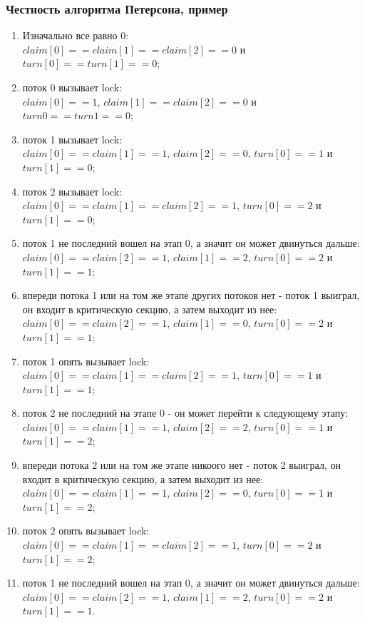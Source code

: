 \begin{frame}
\frametitle{Честность алгоритма Петерсона, пример}
\tiny\begin{enumerate}
  \item Изначально все равно 0:
  \\$claim[0] == claim[1] == claim[2] == 0$ и $turn[0] == turn[1] == 0$;
  \item поток 0 вызывает lock:
  \\$claim[0] == 1$, $claim[1] == claim[2] == 0$ и $turn0 == turn1 == 0$;
  \item поток 1 вызывает lock:
  \\$claim[0] == claim[1] == 1$, $claim[2] == 0$, $turn[0] == 1$ и
  $turn[1] == 0$;
  \item поток 2 вызывает lock:
  \\$claim[0] == claim[1] == claim[2] == 1$, $turn[0] == 2$ и $turn[1] == 0$;
  \item \alert{поток 1 не последний вошел на этап 0, а значит он может
  двинуться дальше:
  \\$claim[0] == claim[2] == 1$, $claim[1] == 2$, $turn[0] == 2$ и
  $turn[1] == 1$;}
  \item впереди потока 1 или на том же этапе других потоков нет - поток 1
  выиграл, он входит в критическую секцию, а затем выходит из нее:
  \\$claim[0] == claim[2] == 1$, $claim[1] == 0$, $turn[0] == 2$ и
  $turn[1] == 1$;
  \item поток 1 опять вызывает lock:
  \\$claim[0] == claim[1] == claim[2] == 1$, $turn[0] == 1$ и $turn[1] == 1$;
  \item поток 2 не последний на этапе 0 - он может перейти к следующему этапу:
  \\$claim[0] == claim[1] == 1$, $claim[2] == 2$, $turn[0] == 1$ и
  $turn[1] == 2$;
  \item впереди потока 2 или на том же этапе никоого нет - поток 2 выиграл, он
  входит в критическую секцию, а затем выходит из нее:
  \\$claim[0] == claim[1] == 1$, $claim[2] == 0$, $turn[0] == 1$ и
  $turn[1] == 2$;
  \item поток 2 опять вызывает lock:
  \\$claim[0] == claim[1] == claim[2] == 1$, $turn[0] == 2$ и $turn[1] == 2$;
  \item \alert{поток 1 не последний вошел на этап 0, а значит он может
  двинуться дальше:
  \\$claim[0] == claim[2] == 1$, $claim[1] == 2$, $turn[0] == 2$ и
  $turn[1] == 1$.}
\end{enumerate}
\end{frame}

